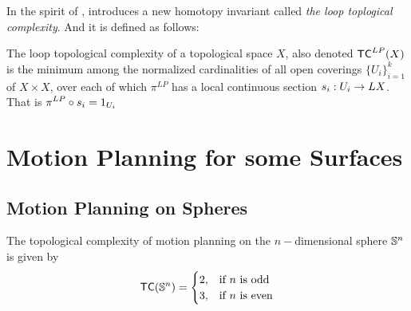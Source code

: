 In the spirit of \cite{farber2003topological}, \cite{derfoufi2015loop} introduces a new homotopy invariant called \textit{the loop toplogical complexity}. And it is defined as follows:

\begin{defn}
    The loop topological complexity of a topological space $X$, also denoted $\textsf{TC}^{LP}(X)$ is the minimum among the normalized cardinalities of all
    open coverings $\{U_i\}_{i = 1}^k$ of $X \times X$, over each of which $\pi^{LP}$ has a local continuous section $s_i : U_i \rightarrow LX$. That is $\displaystyle \pi^{LP} \circ s_i = 1_{U_i}$
\end{defn}

\section{Motion Planning for some Surfaces}

\subsection{Motion Planning on Spheres}
\begin{thm}
    The topological complexity of motion planning on the $n-$dimensional sphere $\mathbb{S}^n$ is given by
    \[
        \textsf{TC}(\mathbb{S}^n) = \begin{cases}
            2, & \text{if $n$ is odd}  \\
            3, & \text{if $n$ is even} \\
        \end{cases}
    \]
\end{thm}

